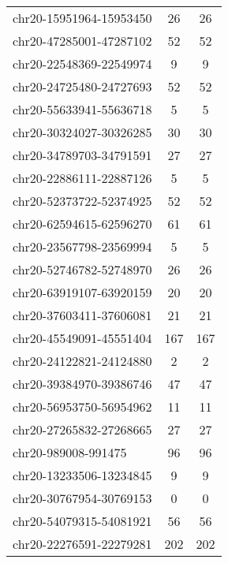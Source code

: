\begin{longtable}{lSS}
	chr20-15951964-15953450 & 26   & 26                              \\
	chr20-47285001-47287102 & 52   & 52                              \\
	chr20-22548369-22549974 & 9    & 9                               \\
	chr20-24725480-24727693 & 52   & 52                              \\
	chr20-55633941-55636718 & 5    & 5                               \\
	chr20-30324027-30326285 & 30   & 30                              \\
	chr20-34789703-34791591 & 27   & 27                              \\
	chr20-22886111-22887126 & 5    & 5                               \\
	chr20-52373722-52374925 & 52   & 52                              \\
	chr20-62594615-62596270 & 61   & 61                              \\
	chr20-23567798-23569994 & 5    & 5                               \\
	chr20-52746782-52748970 & 26   & 26                              \\
	chr20-63919107-63920159 & 20   & 20                              \\
	chr20-37603411-37606081 & 21   & 21                              \\
	chr20-45549091-45551404 & 167  & 167                             \\
	chr20-24122821-24124880 & 2    & 2                               \\
	chr20-39384970-39386746 & 47   & 47                              \\
	chr20-56953750-56954962 & 11   & 11                              \\
	chr20-27265832-27268665 & 27   & 27                              \\
	chr20-989008-991475     & 96   & 96                              \\
	chr20-13233506-13234845 & 9    & 9                               \\
	chr20-30767954-30769153 & 0    & 0                               \\
	chr20-54079315-54081921 & 56   & 56                              \\
	chr20-22276591-22279281 & 202  & 202                             \\

\end{longtable}

